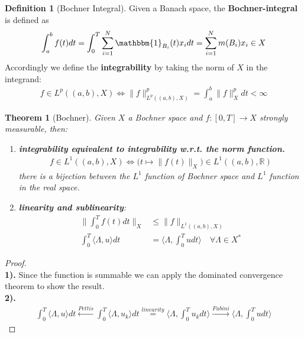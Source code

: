 \documentclass[a4paper,11pt,oneside,fleqn]{book}
\newtheorem{theorem}{Theorem}[section]
\theoremstyle{definition}
\newtheorem{definition}{Definition}[section]
\theoremstyle{remark}
\begin{document}
\begin{definition}[Bochner Integral]
	Given a Banach space, the \textbf{Bochner-integral} is defined as 
	\begin{align*}
		\int_a^b f(t) dt = \int_0^T \sum_{i = 1}^N \mathbbm{1}_{B_i}(t) x_i dt = \sum_{i = 1}^N m(B_i) x_i \in X
	\end{align*}
	Accordingly we define the \textbf{integrability }by taking the norm of $X$ in the integrand:
	\begin{align*}
		f \in L^p((a, b), X) \Leftrightarrow
		\|f\|_{L^p((a, b), X)}^p 
		= \int_a^b \|f\|_X^p dt < \infty
	\end{align*}
\end{definition}

\begin{theorem}[Bochner]
	Given $X$ a Bochner space and $f: [0, T] \rightarrow X$ strongly measurable, then:
	\begin{enumerate}
		\item \textbf{integrability equivalent to integrability w.r.t. the norm function.}
		\begin{align*}
			f \in L^1((a, b), X) \Leftrightarrow \bigg(t \mapsto \|f(t)\|_X \bigg)\in L^1((a,b), \mathbb{R})
		\end{align*}
		there is a bijection between the $L^1$ function of Bochner space and $L^1$ function in the real space. 
		\item \textbf{linearity and sublinearity}:
		\begin{align*}
			\|\int_0^T f(t) dt \|_X  &\le \|f\|_{L^1((a, b), X)}	\\
			\int_0^T \langle \Lambda, u \rangle dt &= \langle \Lambda, \int_0^T u dt \rangle \quad \forall \Lambda \in X^*
		\end{align*}
	\end{enumerate}
\end{theorem}
\begin{proof}
\quad\\
\textbf{1).} Since the function is summable we can apply the dominated convergence theorem to show the result. 
\quad\\
\textbf{2).}
\begin{align*}
	\int_0^T \langle \Lambda, u \rangle dt \overset{Pettis}{\longleftarrow} \int_0^T \langle \Lambda, u_k \rangle dt \overset{linearity}{=} \langle \Lambda, \int_0^T u_k dt \rangle \overset{Fubini}{\longrightarrow} \langle \Lambda, \int_0^T u dt \rangle   
\end{align*}
\end{proof}
\end{document}
